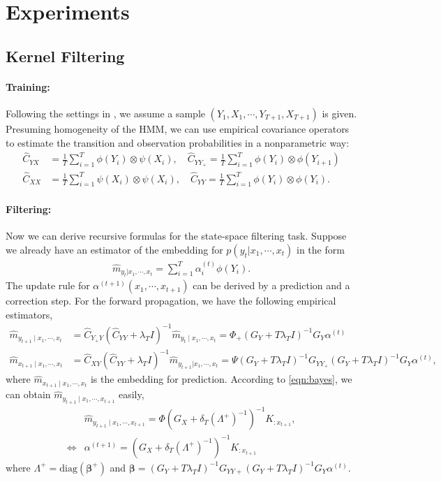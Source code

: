 \documentclass[a4paper]{article}
\newcommand{\up}{\mathrm}
\newcommand{\bs}{\boldsymbol}
\begin{document}
\section{Experiments}
\subsection{Kernel Filtering}
\paragraph{Training:}
Following the settings in \cite{fukumizu2011kernel}, we assume a sample $(Y_1,X_1,\cdots,Y_{T+1},X_{T+1})$ is given. Presuming homogeneity of the HMM, we can use empirical covariance operators to estimate the transition and observation probabilities in a nonparametric way:
\begin{align}
\hat{C}_{YX} &= \frac{1}{T}\sum_{i=1}^T \phi(Y_i)\otimes\psi(X_i),\quad \hat{C}_{YY_+} = \frac{1}{T}\sum_{i=1}^T \phi(Y_{i})\otimes \phi(Y_{i+1})\\
\hat{C}_{XX} &= \frac{1}{T}\sum_{i=1}^T \psi(X_i) \otimes \psi(X_i),\quad \hat{C}_{YY} = \frac{1}{T}\sum_{i=1}^T \phi(Y_i)\otimes\phi(Y_i).
\end{align}
\paragraph{Filtering:}
Now we can derive recursive formulas for the state-space filtering task. Suppose we already have an estimator of the embedding for $p(y_t|x_1,\cdots,x_t)$ in the form
\begin{align}
\hat{m}_{y_t|x_1,\cdots,x_t} = \sum_{i=1}^T \alpha_i^{(t)} \phi(Y_i).
\end{align}
The update rule for $\alpha^{(t+1)}(x_1,\cdots,x_{t+1})$ can be derived by a prediction and a correction step. For the forward propagation, we have the following empirical estimators,
\begin{align}
\hat{m}_{y_{t+1}\mid x_1,\cdots,x_t} &= \hat{C}_{Y_{+}Y}(\hat{C}_{YY}+\lambda_T I)^{-1}\hat{m}_{y_t\mid x_1,\cdots,x_t} = \Phi_{+}(G_Y + T\lambda_T I)^{-1}G_Y \alpha^{(t)}\\
\hat{m}_{x_{t+1}\mid x_1,\cdots,x_t} &= \hat{C}_{XY}(\hat{C}_{YY} + \lambda_{T}I)^{-1}\hat{m}_{y_{t+1}|x_1,\cdots,x_t} = \Psi(G_{Y} + T\lambda_T I)^{-1} G_{YY_+}(G_Y + T\lambda_T I)^{-1}G_{Y} \alpha^{(t)},
\end{align}
where $\hat{m}_{x_{t+1}\mid x_1,\cdots,x_t}$ is the embedding for prediction. According to \eqref{eqn:bayes}, we can obtain $\hat{m}_{y_{t+1}\mid x_1,\cdots,x_{t+1}}$ easily,
\begin{align}
&\hat{m}_{y_{t+1}\mid x_1,\cdots,x_{t+1}} = \Phi(G_X + \delta_T (\Lambda^+)^{-1})^{-1} K_{:x_{t+1}},\\
\Leftrightarrow& \alpha^{(t+1)} = (G_X + \delta_T (\Lambda^+)^{-1})^{-1} K_{:x_{t+1}}
\end{align}
where $\Lambda^+ = \up{diag}(\bs{\beta}^+)$ and $\bs{\beta} = (G_Y + T\lambda_T I)^{-1}G_{YY+}(G_Y + T\lambda_T I)^{-1}G_Y \alpha^{(t)}$.
\end{document}
